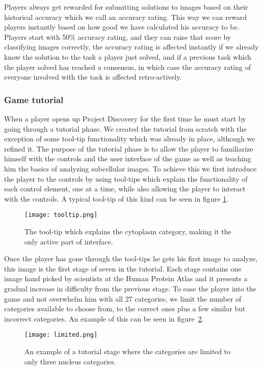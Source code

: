 Players always get rewarded for submitting solutions to images based on their historical accuracy which we call an accuracy rating. This way we can reward players instantly based on how good we have calculated his accuracy to be. Players start with 50\% accuracy rating, and they can raise that score by classifying images correctly, the accuracy rating is affected instantly if we already know the solution to the task a player just solved, and if a previous task which the player solved has reached a consensus, in which case the accuracy rating of everyone involved with the task is affected retro-actively.

\subsubsection{Game tutorial}
When a player opens up Project Discovery for the first time he must start by going through a tutorial phase. We created the tutorial from scratch with the exception of some tool-tip functionality which was already in place, although we refined it. The purpose of the tutorial phase is to allow the player to familiarize himself with the controls and the user interface of the game as well as teaching him the basics of analyzing subcellular images. To achieve this we first introduce the player to the controls by using tool-tips which explain the functionality of each control element, one at a time, while also allowing the player to interact with the controls. A typical tool-tip of this kind can be seen in figure \ref{fig:tooltip}.

\begin{figure}[H]
\centering
\graphicspath{ {./graphics/} }
\centerline{\texttt{[image: tooltip.png]}}
\caption{\label{fig:tooltip}The tool-tip which explains the cytoplasm category, making it the only active part of interface.}
\end{figure}

Once the player has gone through the tool-tips he gets his first image to analyze, this image is the first stage of seven in the tutorial. Each stage contains one image hand picked by scientists at the Human Protein Atlas and it presents a gradual increase in difficulty from the previous stage. To ease the player into the game and not overwhelm him with all 27 categories, we limit the number of categories available to choose from, to the correct ones plus a few similar but incorrect categories. An example of this can be seen in figure~\ref{fig:limited}.

\begin{figure}[H]
\centering
\graphicspath{ {./graphics/} }
\centerline{\texttt{[image: limited.png]}}
\caption{\label{fig:limited}An example of a tutorial stage where the categories are limited to only three nucleus categories.}
\end{figure}

